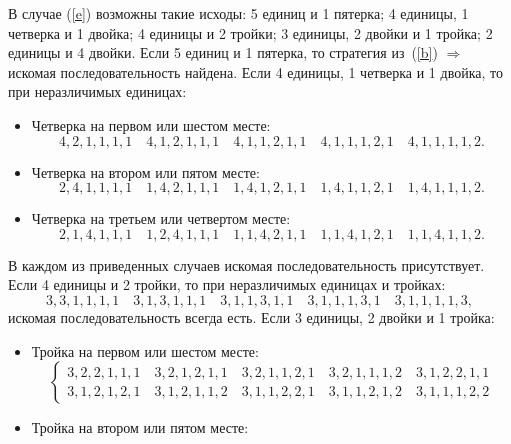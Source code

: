 \documentclass{article}
\begin{document}
\begin{enumerate}
        В случае (\ref{e}) возможны такие исходы: 5 единиц и 1 пятерка; 4 единицы, 1 четверка и 1 двойка; 4 единицы и 2 тройки; 3 единицы, 2 двойки и 1 тройка; 2 единицы и 4 двойки. Если 5 единиц и 1 пятерка, то стратегия из~(\ref{b}) $\Rightarrow$ искомая последовательность найдена. Если 4 единицы, 1 четверка и 1 двойка, то при неразличимых единицах:
        \begin{itemize}
            \item Четверка на первом или шестом месте:
            \begin{equation}
                4,2,1,1,1,1 \quad 4,1,2,1,1,1 \quad 4,1,1,2,1,1 \quad 4,1,1,1,2,1 \quad 4,1,1,1,1,2.
            \end{equation}
            \item Четверка на втором или пятом месте:
            \begin{equation}
                2,4,1,1,1,1 \quad 1,4,2,1,1,1 \quad 1,4,1,2,1,1 \quad 1,4,1,1,2,1 \quad 1,4,1,1,1,2.
            \end{equation}
            \item Четверка на третьем или четвертом месте:
            \begin{equation}
                2,1,4,1,1,1 \quad 1,2,4,1,1,1 \quad 1,1,4,2,1,1 \quad 1,1,4,1,2,1 \quad 1,1,4,1,1,2.
            \end{equation}
        \end{itemize}
        В каждом из приведенных случаев искомая последовательность присутствует. Если 4 единицы и 2 тройки, то при неразличимых единицах и тройках:
        \begin{equation}
            3,3,1,1,1,1 \quad 3,1,3,1,1,1 \quad 3,1,1,3,1,1 \quad 3,1,1,1,3,1 \quad 3,1,1,1,1,3,
        \end{equation}
        искомая последовательность всегда есть. Если 3 единицы, 2 двойки и 1 тройка:
        \begin{itemize}
            \item Тройка на первом или шестом месте:
            \begin{equation}
                \begin{cases}
                    3,2,2,1,1,1 \quad 3,2,1,2,1,1 \quad 3,2,1,1,2,1 \quad 3,2,1,1,1,2 \quad 3,1,2,2,1,1 \\ 3,1,2,1,2,1 \quad 3,1,2,1,1,2 \quad 3,1,1,2,2,1 \quad 3,1,1,2,1,2 \quad 3,1,1,1,2,2
                \end{cases}
            \end{equation}
            \item Тройка на втором или пятом месте:

\end{itemize}
\end{enumerate}
\end{document}
